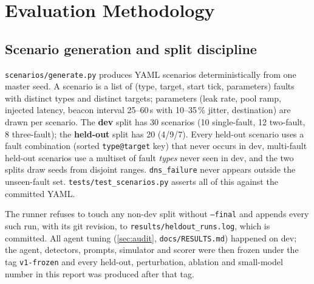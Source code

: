 \documentclass[11pt,a4paper]{article}
\newcommand{\code}[1]{\texttt{#1}}
\begin{document}
\section{Evaluation Methodology}
\label{sec:eval}

\subsection{Scenario generation and split discipline}
\code{scenarios/generate.py} produces YAML scenarios deterministically from one master seed.
A scenario is a list of (type, target, start tick, parameters) faults with distinct types and distinct
targets; parameters (leak rate, pool ramp, injected latency, beacon interval 25--60\,s with
10--35\,\% jitter, destination) are drawn per scenario. The \textbf{dev} split has 30 scenarios
(10 single-fault, 12 two-fault, 8 three-fault); the \textbf{held-out} split has 20 (4/9/7). Every
held-out scenario uses a fault combination (sorted \code{type@target} key) that never occurs in dev,
multi-fault held-out scenarios use a multiset of fault \emph{types} never seen in dev, and the two
splits draw seeds from disjoint ranges. \code{dns\_failure} never appears outside the unseen-fault
set. \code{tests/test\_scenarios.py} asserts all of this against the committed YAML.

The runner refuses to touch any non-dev split without \code{--final} and appends every such run,
with its git revision, to \code{results/heldout\_runs.log}, which is committed. All agent tuning
(\cref{sec:audit}, \code{docs/RESULTS.md}) happened on dev; the agent, detectors, prompts,
simulator and scorer were then frozen under the tag \code{v1-frozen} and every held-out,
perturbation, ablation and small-model number in this report was produced after that tag.
\end{document}
